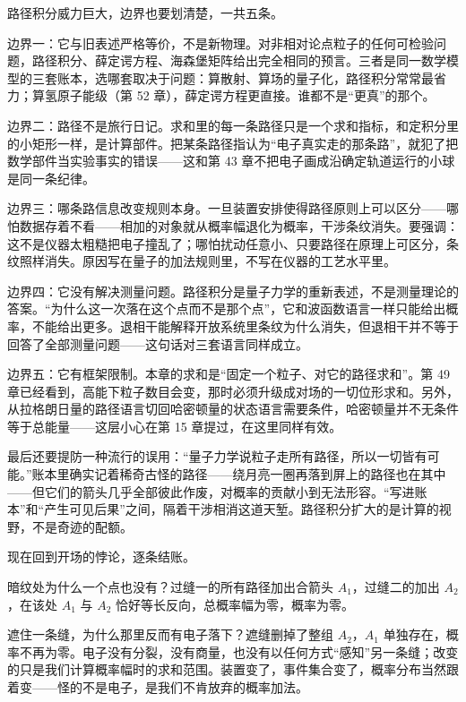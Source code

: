 
路径积分威力巨大，边界也要划清楚，一共五条。

边界一：它与旧表述严格等价，不是新物理。对非相对论点粒子的任何可检验问题，路径积分、薛定谔方程、海森堡矩阵给出完全相同的预言。三者是同一数学模型的三套账本，选哪套取决于问题：算散射、算场的量子化，路径积分常常最省力；算氢原子能级（第 52 章），薛定谔方程更直接。谁都不是“更真”的那个。

边界二：路径不是旅行日记。求和里的每一条路径只是一个求和指标，和定积分里的小矩形一样，是计算部件。把某条路径指认为“电子真实走的那条路”，就犯了把数学部件当实验事实的错误——这和第 43 章不把电子画成沿确定轨道运行的小球是同一条纪律。

边界三：哪条路信息改变规则本身。一旦装置安排使得路径原则上可以区分——哪怕数据存着不看——相加的对象就从概率幅退化为概率，干涉条纹消失。要强调：这不是仪器太粗糙把电子撞乱了；哪怕扰动任意小、只要路径在原理上可区分，条纹照样消失。原因写在量子的加法规则里，不写在仪器的工艺水平里。

边界四：它没有解决测量问题。路径积分是量子力学的重新表述，不是测量理论的答案。“为什么这一次落在这个点而不是那个点”，它和波函数语言一样只能给出概率，不能给出更多。退相干能解释开放系统里条纹为什么消失，但退相干并不等于回答了全部测量问题——这句话对三套语言同样成立。

边界五：它有框架限制。本章的求和是“固定一个粒子、对它的路径求和”。第 49 章已经看到，高能下粒子数目会变，那时必须升级成对场的一切位形求和。另外，从拉格朗日量的路径语言切回哈密顿量的状态语言需要条件，哈密顿量并不无条件等于总能量——这层小心在第 15 章提过，在这里同样有效。

最后还要提防一种流行的误用：“量子力学说粒子走所有路径，所以一切皆有可能。”账本里确实记着稀奇古怪的路径——绕月亮一圈再落到屏上的路径也在其中——但它们的箭头几乎全部彼此作废，对概率的贡献小到无法形容。“写进账本”和“产生可见后果”之间，隔着干涉相消这道天堑。路径积分扩大的是计算的视野，不是奇迹的配额。


现在回到开场的悖论，逐条结账。

暗纹处为什么一个点也没有？过缝一的所有路径加出合箭头 \(A_1\)，过缝二的加出 \(A_2\)，在该处 \(A_1\) 与 \(A_2\) 恰好等长反向，总概率幅为零，概率为零。

遮住一条缝，为什么那里反而有电子落下？遮缝删掉了整组 \(A_2\)，\(A_1\) 单独存在，概率不再为零。电子没有分裂，没有商量，也没有以任何方式“感知”另一条缝；改变的只是我们计算概率幅时的求和范围。装置变了，事件集合变了，概率分布当然跟着变——怪的不是电子，是我们不肯放弃的概率加法。

